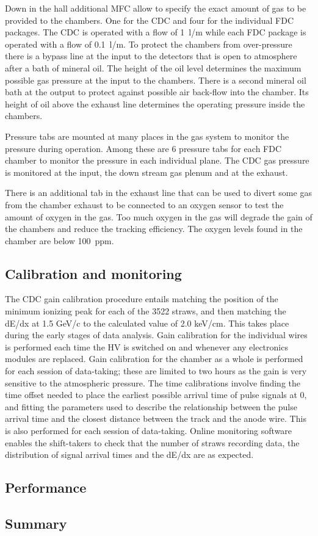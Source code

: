 Down in the hall additional MFC allow to specify the exact amount of gas to be provided to the chambers. One for the CDC
and four for the individual FDC packages. The CDC is operated with a flow of 1~l/m while each FDC package is operated with
a flow of 0.1~l/m. To protect the chambers from over-pressure there is a bypass line at the input to the detectors that
is open to atmosphere after a bath of mineral oil. The height of the oil level determines the maximum possible gas pressure at
the input to the chambers. There is a second mineral oil bath at the output to protect against possible air back-flow into
the chamber. Its height of oil above the exhaust line determines the operating pressure inside the chambers.

Pressure tabs are mounted at many places in the gas system to monitor the pressure during operation. Among these are
6 pressure tabs for each FDC chamber to monitor the pressure in each individual plane. The CDC gas pressure is monitored
at the input, the down stream gas plenum and at the exhaust.

There is an additional tab in the exhaust line that can be used to divert some gas from the chamber exhaust to be connected
to an oxygen sensor to test the amount of oxygen in the gas. Too much oxygen in the gas will degrade the gain of
the chambers and reduce the tracking efficiency. The oxygen levels found in the chamber are below 100~ppm. 

\subsection{Calibration and monitoring \label{sec:dccalib}}
The CDC gain calibration procedure entails matching the position of the minimum ionizing peak for each of the 3522 straws, and then matching the dE/dx at 1.5 GeV/c to the calculated value of 2.0 keV/cm. 
This takes place during the early stages of data analysis.
Gain calibration for the individual wires is performed each time the HV is switched on and whenever any electronics modules are replaced. 
Gain calibration for the chamber as a whole is performed for each session of data-taking; these are limited to two hours as the gain is very sensitive to the atmospheric pressure.
The time calibrations involve finding the time offset needed to place the earliest possible arrival time of pulse signals at 0, and fitting the parameters used to describe the relationship between the pulse arrival time and the closest distance between the track and the anode wire. This is also performed for each session of data-taking. 
Online monitoring software enables the shift-takers to check that the number of straws recording data, the distribution of signal arrival times and the dE/dx are as expected. 

\subsection{Performance \label{sec:dcperformance}}



\subsection{Summary \label{sec:dcsummary}}
 
